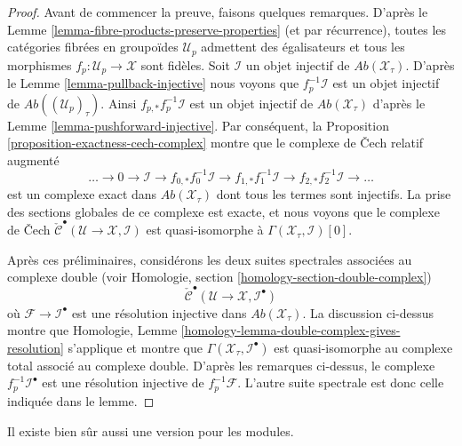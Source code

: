 \begin{proof}
Avant de commencer la preuve, faisons quelques remarques. D'après le
Lemme \ref{lemma-fibre-products-preserve-properties}
(et par récurrence), toutes les catégories fibrées en groupoïdes $\mathcal{U}_p$
admettent des égalisateurs et tous les morphismes $f_p : \mathcal{U}_p \to \mathcal{X}$
sont fidèles. Soit $\mathcal{I}$ un objet injectif
de $\textit{Ab}(\mathcal{X}_\tau)$. D'après le
Lemme \ref{lemma-pullback-injective}
nous voyons que $f_p^{-1}\mathcal{I}$ est un objet injectif de
$\textit{Ab}((\mathcal{U}_p)_\tau)$.
Ainsi $f_{p, *}f_p^{-1}\mathcal{I}$ est un objet injectif de
$\textit{Ab}(\mathcal{X}_\tau)$ d'après le
Lemme \ref{lemma-pushforward-injective}.
Par conséquent, la
Proposition \ref{proposition-exactness-cech-complex}
montre que le complexe de {\v C}ech relatif augmenté
$$
\ldots \to 0 \to
\mathcal{I} \to
f_{0, *}f_0^{-1}\mathcal{I} \to
f_{1, *}f_1^{-1}\mathcal{I} \to
f_{2, *}f_2^{-1}\mathcal{I} \to \ldots
$$
est un complexe exact dans $\textit{Ab}(\mathcal{X}_\tau)$ dont tous les
termes sont injectifs. La prise des sections globales de ce complexe est exacte,
et nous voyons que le complexe de {\v C}ech
$\check{\mathcal{C}}^\bullet(\mathcal{U} \to \mathcal{X}, \mathcal{I})$
est quasi-isomorphe à $\Gamma(\mathcal{X}_\tau, \mathcal{I})[0]$.

\medskip\noindent
Après ces préliminaires, considérons les deux suites spectrales
associées au complexe double (voir
Homologie, section \ref{homology-section-double-complex})
$$
\check{\mathcal{C}}^\bullet(\mathcal{U} \to \mathcal{X}, \mathcal{I}^\bullet)
$$
où $\mathcal{F} \to \mathcal{I}^\bullet$ est une résolution injective
dans $\textit{Ab}(\mathcal{X}_\tau)$.
La discussion ci-dessus montre que
Homologie, Lemme \ref{homology-lemma-double-complex-gives-resolution}
s'applique et montre que
$\Gamma(\mathcal{X}_\tau, \mathcal{I}^\bullet)$
est quasi-isomorphe au complexe total associé au complexe double.
D'après les remarques ci-dessus, le complexe $f_p^{-1}\mathcal{I}^\bullet$ est une
résolution injective de $f_p^{-1}\mathcal{F}$. L'autre suite
spectrale est donc celle indiquée dans le lemme.
\end{proof}

\noindent
Il existe bien sûr aussi une version pour les modules.

